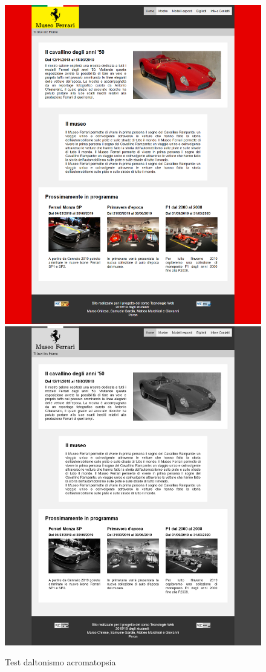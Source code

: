 \begin{figure}[h!]
	\begin{center}
		\includegraphics[scale=0.144]{Images/original.png}
		\includegraphics[scale=0.144]{Images/acromatopsia.png}
		\caption{Test daltonismo acromatopsia}
	\end{center}
\end{figure}


